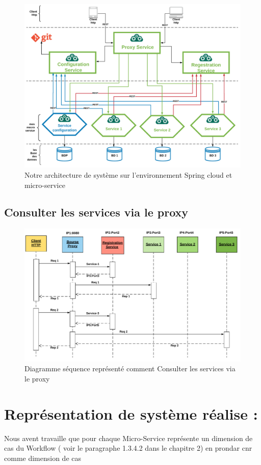 \begin{figure}[H]
	\centering
	\includegraphics[width=1\linewidth]{images/cloudMS}
	\caption{Notre architecture de système sur l'environnement Spring cloud et micro-service}
	\label{fig:cloudms}
\end{figure}
  \subsection{Consulter les services via le proxy }
    
    
    
\begin{figure}[H]
	\centering
	\includegraphics[width=0.7\linewidth]{images/secance}
	\caption{Diagramme séquence représenté comment  Consulter les services via le proxy}
	\label{fig:secance}
\end{figure}

\section{Représentation de système réalise :}
Nous avent  travaille  que pour chaque Micro-Service représente un dimension de cas du Workflow  (  voir le paragraphe 1.3.4.2  dans le chapitre 2)
 en prondar    \ac{cnr} comme dimension de cas 